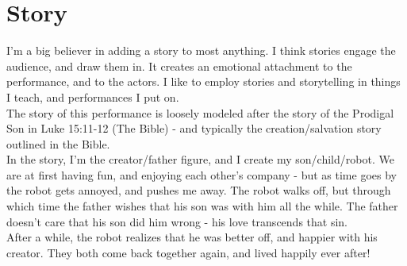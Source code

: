 	\chapter{Story}
    	\label{Story}
		I'm a big believer in adding a story to most anything. I think stories engage the audience, and draw them in. It creates an emotional attachment to the performance, and to the actors. I like to employ stories and storytelling in things I teach, and performances I put on.\\
        
        The story of this performance is loosely modeled after the story of the Prodigal Son in Luke 15:11-12 (The Bible) - and typically the creation/salvation story outlined in the Bible.\\
        
        In the story, I'm the creator/father figure, and I create my son/child/robot. We are at first having fun, and enjoying each other's company - but as time goes by the robot gets annoyed, and pushes me away. The robot walks off, but through which time the father wishes that his son was with him all the while. The father doesn't care that his son did him wrong - his love transcends that sin.\\
        
        After a while, the robot realizes that he was better off, and happier with his creator. They both come back together again, and lived happily ever after!\\              